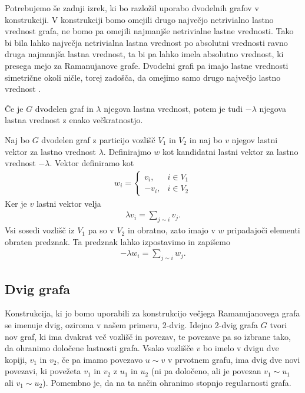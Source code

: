 Potrebujemo še zadnji izrek, ki bo razložil uporabo dvodelnih grafov v konstrukciji. V konstrukciji bomo omejili drugo največjo netrivialno lastno vrednost grafa, ne bomo pa omejili najmanjše netrivialne lastne vrednosti. Tako bi bila lahko največja netrivialna lastna vrednost po absolutni vrednosti ravno druga najmanjša lastna vrednost, ta bi pa lahko imela absolutno vrednost, ki presega mejo za Ramanujanove grafe. Dvodelni grafi pa imajo lastne vrednosti simetrične okoli ničle, torej zadošča, da omejimo samo drugo največjo lastno vrednost \cite{godsil}.

\begin{izrek}
    Če je \(G\) dvodelen graf in \(\lambda\) njegova lastna vrednost, potem je tudi \(-\lambda\) njegova lastna vrednost z enako večkratnostjo.
\end{izrek}
\begin{dokaz}
    Naj bo \(G\) dvodelen graf z particijo vozlišč \(V_1\) in \(V_2\) in naj bo \(v\) njegov lastni vektor za lastno vrednost \(\lambda\). Definirajmo \(w\) kot kandidatni lastni vektor za lastno vrednost \(-\lambda\). Vektor definiramo kot
    \begin{align*}
        w_i = \begin{cases}
                  v_i,  & i\in V_1 \\
                  -v_i, & i\in V_2
              \end{cases}
    \end{align*}
    Ker je \(v\) lastni vektor velja
    \begin{align*}
        \lambda v_i = \sum_{j\sim i} v_j.
    \end{align*}
    Vsi sosedi vozlišč iz \(V_1\) pa so v \(V_2\) in obratno, zato imajo v \(w\) pripadajoči elementi obraten predznak. Ta predznak lahko izpostavimo in zapišemo
    \begin{align*}
        -\lambda w_i = \sum_{j\sim i} w_j.
    \end{align*}
\end{dokaz}

\subsection{Dvig grafa}
Konstrukcija, ki jo bomo uporabili za konstrukcijo večjega Ramanujanovega grafa se imenuje dvig, oziroma v našem primeru, 2-dvig. Idejno 2-dvig grafa \(G\) tvori nov graf, ki ima dvakrat več vozlišč in povezav, te povezave pa so izbrane tako, da ohranimo določene lastnosti grafa. Vsako vozlišče \(v\) bo imelo v dvigu dve kopiji, \(v_1\) in \(v_2\), če pa imamo povezavo \(u\sim v\) v prvotnem grafu, ima dvig dve novi povezavi, ki povežeta \(v_1\) in \(v_2\) z \(u_1\) in \(u_2\) (ni pa določeno, ali je povezan \(v_1\sim u_1\) ali \(v_1\sim u_2\)). Pomembno je, da na ta način ohranimo stopnjo regularnosti grafa.

